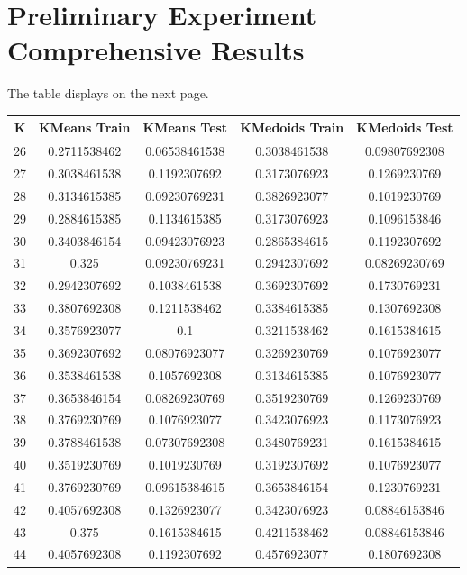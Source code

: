 \documentclass{article}
\begin{document}
\section{Preliminary Experiment Comprehensive Results} \label{result_appendix}
The table displays on the next page.
\begin{table}[ht]
\centering
\begin{tabular}{|c|c|c|c|c|}
\hline
\textbf{K}&\textbf{KMeans Train}&\textbf{KMeans Test}&\textbf{KMedoids Train}&\textbf{KMedoids Test} \\ \hline \hline
26 & 0.2711538462 & 0.06538461538 & 0.3038461538   & 0.09807692308 \\ 
27 & 0.3038461538 & 0.1192307692  & 0.3173076923   & 0.1269230769  \\ 
28 & 0.3134615385 & 0.09230769231 & 0.3826923077   & 0.1019230769  \\ 
29 & 0.2884615385 & 0.1134615385  & 0.3173076923   & 0.1096153846  \\ 
30 & 0.3403846154 & 0.09423076923 & 0.2865384615   & 0.1192307692  \\ 
31 & 0.325        & 0.09230769231 & 0.2942307692   & 0.08269230769 \\ 
32 & 0.2942307692 & 0.1038461538  & 0.3692307692   & 0.1730769231  \\ 
33 & 0.3807692308 & 0.1211538462  & 0.3384615385   & 0.1307692308  \\ 
34 & 0.3576923077 & 0.1           & 0.3211538462   & 0.1615384615  \\ 
35 & 0.3692307692 & 0.08076923077 & 0.3269230769   & 0.1076923077  \\ 
36 & 0.3538461538 & 0.1057692308  & 0.3134615385   & 0.1076923077  \\ 
37 & 0.3653846154 & 0.08269230769 & 0.3519230769   & 0.1269230769  \\ 
38 & 0.3769230769 & 0.1076923077  & 0.3423076923   & 0.1173076923  \\ 
39 & 0.3788461538 & 0.07307692308 & 0.3480769231   & 0.1615384615  \\ 
40 & 0.3519230769 & 0.1019230769  & 0.3192307692   & 0.1076923077  \\ 
41 & 0.3769230769 & 0.09615384615 & 0.3653846154   & 0.1230769231  \\ 
42 & 0.4057692308 & 0.1326923077  & 0.3423076923   & 0.08846153846 \\ 
43 & 0.375        & 0.1615384615  & 0.4211538462   & 0.08846153846 \\ 
44 & 0.4057692308 & 0.1192307692  & 0.4576923077   & 0.1807692308  \\ 

\end{tabular}
\end{table}
\end{document}
